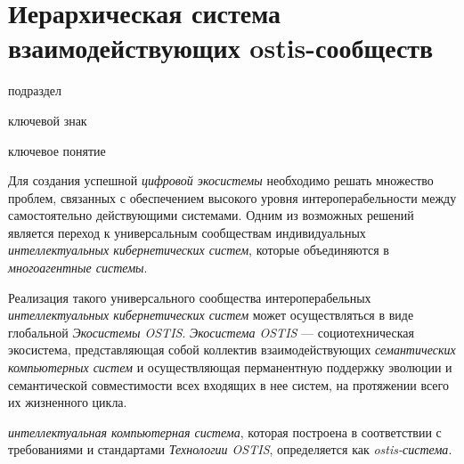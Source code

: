 \section{Иерархическая система взаимодействующих ostis-сообществ}
{\label{sec_ecosystem_structure}} 

\begin{SCn}

\begin{scnrelfromlist}{подраздел}
\end{scnrelfromlist}

\begin{scnrelfromlist}{ключевой знак}
\end{scnrelfromlist}

\begin{scnrelfromlist}{ключевое понятие}
\end{scnrelfromlist}


\end{SCn}

Для создания успешной \textit{цифровой экосистемы} необходимо решать множество проблем, связанных с обеспечением высокого уровня интероперабельности между самостоятельно действующими системами. Одним из возможных решений является переход к универсальным сообществам индивидуальных \textit{интеллектуальных кибернетических систем}, которые объединяются в \textit{многоагентные системы}.

Реализация такого универсального сообщества интероперабельных \textit{интеллектуальных кибернетических систем} может осуществляться в виде глобальной \textit{Экосистемы OSTIS}. 
\textit{Экосистема OSTIS} --- социотехническая экосистема, представляющая собой коллектив взаимодействующих \textit{семантических компьютерных систем} и осуществляющая перманентную поддержку эволюции и семантической совместимости всех входящих в нее систем, на протяжении всего их жизненного цикла. 

\textit{интеллектуальная компьютерная система}, которая построена в соответствии с требованиями и стандартами \textit{Технологии OSTIS}, определяется как \textit{ostis-система}. 

